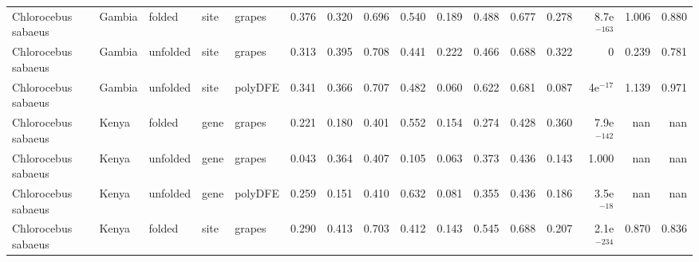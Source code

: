 \begin{longtable}{lllllrrrrrrrrrrr}
 Chlorocebus sabaeus &                    Gambia &    folded &  site &   grapes &                              0.376 &                               0.320 &                 0.696 &                 0.540 &                              0.189 &                               0.488 &                 0.677 &                 0.278 & 8.7e$^{-163}$ &  1.006 &  0.880 \\
 Chlorocebus sabaeus &                    Gambia &  unfolded &  site &   grapes &                              0.313 &                               0.395 &                 0.708 &                 0.441 &                              0.222 &                               0.466 &                 0.688 &                 0.322 &             0 &  0.239 &  0.781 \\
 Chlorocebus sabaeus &                    Gambia &  unfolded &  site &  polyDFE &                              0.341 &                               0.366 &                 0.707 &                 0.482 &                              0.060 &                               0.622 &                 0.681 &                 0.087 &    4e$^{-17}$ &  1.139 &  0.971 \\
 Chlorocebus sabaeus &                     Kenya &    folded &  gene &   grapes &                              0.221 &                               0.180 &                 0.401 &                 0.552 &                              0.154 &                               0.274 &                 0.428 &                 0.360 & 7.9e$^{-142}$ &    nan &    nan \\
 Chlorocebus sabaeus &                     Kenya &  unfolded &  gene &   grapes &                              0.043 &                               0.364 &                 0.407 &                 0.105 &                              0.063 &                               0.373 &                 0.436 &                 0.143 &         1.000 &    nan &    nan \\
 Chlorocebus sabaeus &                     Kenya &  unfolded &  gene &  polyDFE &                              0.259 &                               0.151 &                 0.410 &                 0.632 &                              0.081 &                               0.355 &                 0.436 &                 0.186 &  3.5e$^{-18}$ &    nan &    nan \\
 Chlorocebus sabaeus &                     Kenya &    folded &  site &   grapes &                              0.290 &                               0.413 &                 0.703 &                 0.412 &                              0.143 &                               0.545 &                 0.688 &                 0.207 & 2.1e$^{-234}$ &  0.870 &  0.836 \\

\end{longtable}
